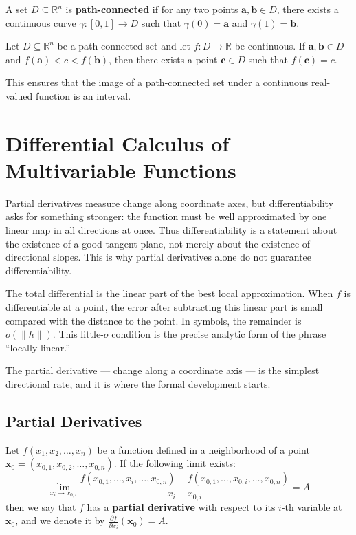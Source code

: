 \begin{definition}
A set $D \subseteq \mathbb{R}^n$ is \textbf{path-connected} if for any two points $\mathbf{a}, \mathbf{b} \in D$, there exists a continuous curve $\gamma: [0, 1] \to D$ such that $\gamma(0) = \mathbf{a}$ and $\gamma(1) = \mathbf{b}$.
\end{definition}

\begin{theorem}
Let $D \subseteq \mathbb{R}^n$ be a path-connected set and let $f: D \to \mathbb{R}$ be continuous. If $\mathbf{a}, \mathbf{b} \in D$ and $f(\mathbf{a}) < c < f(\mathbf{b})$, then there exists a point $\mathbf{c} \in D$ such that $f(\mathbf{c}) = c$.
\end{theorem}

This ensures that the image of a path-connected set under a continuous real-valued function is an interval.

\section{Differential Calculus of Multivariable Functions}


Partial derivatives measure change along coordinate axes, but differentiability asks for something stronger: the function must be well approximated by one linear map in all directions at once. Thus differentiability is a statement about the existence of a good tangent plane, not merely about the existence of directional slopes. This is why partial derivatives alone do not guarantee differentiability.

The total differential is the linear part of the best local approximation. When $f$ is differentiable at a point, the error after subtracting this linear part is small compared with the distance to the point. In symbols, the remainder is $o(\|h\|)$. This little-$o$ condition is the precise analytic form of the phrase ``locally linear.''

The partial derivative — change along a coordinate axis — is the simplest directional rate, and it is where the formal development starts.

\subsection{Partial Derivatives}

\begin{definition}
Let $f(x_1, x_2, \dots, x_n)$ be a function defined in a neighborhood of a point $\mathbf{x}_0 = (x_{0,1}, x_{0,2}, \dots, x_{0,n})$. If the following limit exists:
\[ \lim_{x_i \to x_{0,i}} \frac{f(x_{0,1}, \dots, x_i, \dots, x_{0,n}) - f(x_{0,1}, \dots, x_{0,i}, \dots, x_{0,n})}{x_i - x_{0,i}} = A \]
then we say that $f$ has a \textbf{partial derivative} with respect to its $i$-th variable at $\mathbf{x}_0$, and we denote it by $\frac{\partial f}{\partial x_i}(\mathbf{x}_0) = A$.
\end{definition}

